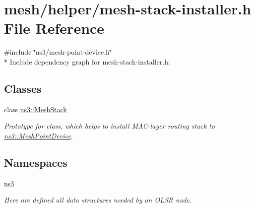 \hypertarget{mesh-stack-installer_8h}{}\section{mesh/helper/mesh-\/stack-\/installer.h File Reference}
\label{mesh-stack-installer_8h}
{\ttfamily \#include \char`\"{}ns3/mesh-\/point-\/device.\+h\char`\"{}}\\*
Include dependency graph for mesh-\/stack-\/installer.h\+:
\subsection*{Classes}
\begin{DoxyCompactItemize}
\item 
class \hyperlink{classns3_1_1MeshStack}{ns3\+::\+Mesh\+Stack}
\begin{DoxyCompactList}\small\item\em Prototype for class, which helps to install M\+A\+C-\/layer routing stack to \hyperlink{classns3_1_1MeshPointDevice}{ns3\+::\+Mesh\+Point\+Device}. \end{DoxyCompactList}\end{DoxyCompactItemize}
\subsection*{Namespaces}
\begin{DoxyCompactItemize}
\item 
 \hyperlink{namespacens3}{ns3}
\begin{DoxyCompactList}\small\item\em Here are defined all data structures needed by an O\+L\+SR node. \end{DoxyCompactList}\end{DoxyCompactItemize}

